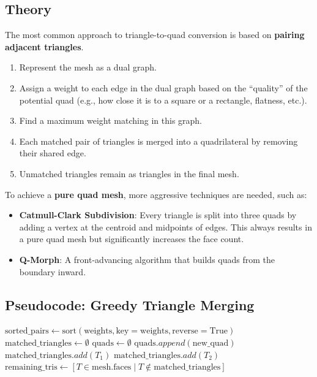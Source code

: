 \subsection{Theory}
The most common approach to triangle-to-quad conversion is based on \textbf{pairing adjacent triangles}.
\begin{enumerate}
\item Represent the mesh as a dual graph.
\item Assign a weight to each edge in the dual graph based on the ``quality'' of the potential quad (e.g., how close it is to a square or a rectangle, flatness, etc.).
\item Find a maximum weight matching in this graph.
\item Each matched pair of triangles is merged into a quadrilateral by removing their shared edge.
\item Unmatched triangles remain as triangles in the final mesh.
\end{enumerate}

To achieve a \textbf{pure quad mesh}, more aggressive techniques are needed, such as:
\begin{itemize}
\item \textbf{Catmull-Clark Subdivision}: Every triangle is split into three quads by adding a vertex at the centroid and midpoints of edges. This always results in a pure quad mesh but significantly increases the face count.
\item \textbf{Q-Morph}: A front-advancing algorithm that builds quads from the boundary inward.
\end{itemize}

\subsection{Pseudocode: Greedy Triangle Merging}
\begin{algorithm}
\caption{Greedy Triangle to Quad}
\label{alg:greedy_triangle_to_quad}
\begin{algorithmic}[1]
    \State {}
    \State {}
    \State $\text{sorted\_pairs} \gets \text{sort}(\text{weights}, \text{key}=\text{weights}, \text{reverse}=\text{True})$
    \State $\text{matched\_triangles} \gets \emptyset$
    \State $\text{quads} \gets \emptyset$
            \State {}
            \State $\text{quads}.append(\text{new\_quad})$
            \State $\text{matched\_triangles}.add(T_1)$
            \State $\text{matched\_triangles}.add(T_2)$
        \EndIf
    \EndFor
    \State $\text{remaining\_tris} \gets [T \in \text{mesh.faces} \mid T \notin \text{matched\_triangles}]$
    \State \Return {}
\EndFunction
\end{algorithmic}
\end{algorithm}

